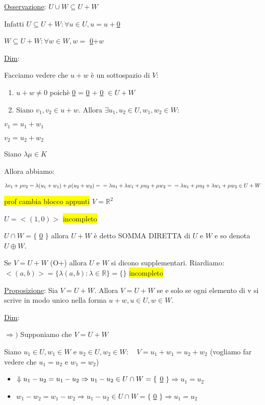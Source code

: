 \documentclass{article}
\newcommand{\hl}[1]{\colorbox{yellow}{#1}}
\newcommand{\ul}[1]{\underline{#1}}
\newcommand{\R}{\mathbb{R}}
\newcommand{\Def}[2]{\paragraph{\ul{Def}:}#1\\\hspace*{3em}\begin{minipage}{.8\textwidth}#2\end{minipage}}
\begin{document}
\ul{Osservazione}: $U\cup W\subseteq U+W$

Infatti $U\subseteq U+W:\forall u\in U,u=u+$\ul{0}

$W\subseteq U+W:\forall w\in W,w=$ \ul{0}$+w$

\ul{Dim}:

Facciamo vedere che $u+w$ è un sottospazio di $V$:
\begin{enumerate}
	\item $u+w\not=0$ poichè \ul{0} = \ul{0} $+$ \ul{0} $\in U+W$
	\item Siano $v_1,v_2\in u+w$. Allora $\exists u_1,u_2\in U,w_1,w_2\in W:$
\end{enumerate}

$v_1=u_1+w_1$

$v_2=u_2+w_2$

Siano $\lambda\mu\in K$

Allora abbiamo:

$\lambda v_1+\mu v_2=\lambda(u_1+w_1)+\mu(u_2+w_2)=\\=\lambda u_1+\lambda w_1+\mu u_2 + \mu w_2=\\=\lambda u_1+\mu u_2+\lambda w_1+\mu w_2\in U+W$

\hl{prof cambia blocco appunti}
$V=\R^2$

$U=<(1,0)>$
\hl{incompleto}


$U\cap W=\{$ \ul{0} $\}$ allora $U+W$ è detto SOMMA DIRETTA di $U$ e $W$ e so denota $U\oplus W$.

Se $V=U+W$ (O+) allora $U$ e $W$ si dicono supplementari.
\hrulefill
Riardiamo: $<(a,b)>=\{\lambda(a,b):\lambda\in\R\}=\{\}$
\hl{incompleto}

\ul{Proposizione}: Sia $V=U+W$. Allora $V=U+W$ se e solo se ogni elemento di v si scrive in modo unico nella forma $u+w, u\in U, w\in W$.

\ul{Dim}:

$\Rightarrow)$ Supponiamo che $V=U+W$

Siano $u_1\in U,w_1\in W$ e $u_2\in U,w_2\in W:\quad V=u_1+w_1=u_2+w_2$ (vogliamo far vedere che $u_1=u_2$ e $w_1=w_2$)

\begin{itemize}
	\item $\Downarrow\\u_1-u_2=u_1-u_2\Rightarrow u_1-u_2\in U\cap W=\{$ \ul{0} $\}\Rightarrow u_1=u_2$
	\item $w_1-w_2=w_1-w_2\Rightarrow u_1-u_2\in U\cap W=\{$ \ul{0} $\}\Rightarrow u_1=u_2$
\end{itemize}
\end{document}

